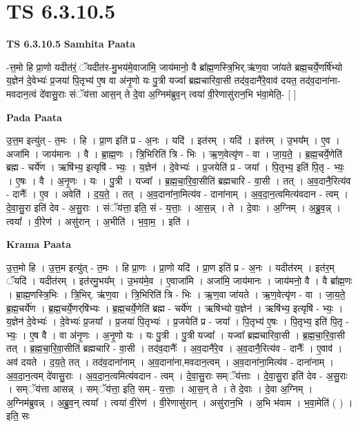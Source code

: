 \documentclass[17pt]{extarticle}
\begin{document}
\section{ TS 6.3.10.5 }

\textbf{TS 6.3.10.5 } \newline
\textbf{Samhita Paata} \newline

-त्त॒मो हि प्रा॒णो यदीत॑रं॒ ॅयदीत॑र-मु॒भय॑मे॒वाजा॑मि॒ जाय॑मानो॒ वै ब्रा᳚ह्म॒णस्त्रि॒भिर्.ऋ॑ण॒वा जा॑यते ब्रह्म॒चर्ये॒णर्षि॑भ्यो य॒ज्ञेन॑ दे॒वेभ्यः॑ प्र॒जया॑ पि॒तृभ्य॑ ए॒ष वा अ॑नृ॒णो यः पु॒त्री यज्वा᳚ ब्रह्मचारिवा॒सी तद॑व॒दानै॑रे॒वाव॑ दयत॒ तद॑व॒दाना॑ना-मवदान॒त्वं दे॑वासु॒राः संॅय॑त्ता आस॒न् ते दे॒वा अ॒ग्निम॑ब्रुव॒न् त्वया॑ वी॒रेणासु॑रान॒भि भ॑वा॒मेति॒- [  ] \newline

\textbf{Pada Paata} \newline

उ॒त्त॒म इत्यु॑त् - त॒मः । हि । प्रा॒ण इति॑ प्र - अ॒नः । यदि॑ । इत॑रम् । यदि॑ । इत॑रम् । उ॒भय᳚म् । ए॒व । अजा॑मि । जाय॑मानः । वै । ब्रा॒ह्म॒णः । त्रि॒भिरिति॑ त्रि - भिः । ऋ॒ण॒वेत्यृ॑ण - वा । जा॒य॒ते॒ । ब्र॒ह्म॒चर्ये॒णेति॑ ब्रह्म - चर्ये॑ण । ऋषि॑भ्य॒ इत्यृषि॑ - भ्यः॒ । य॒ज्ञेन॑ । दे॒वेभ्यः॑ । प्र॒जयेति॑ प्र - जया᳚ । पि॒तृभ्य॒ इति॑ पि॒तृ - भ्यः॒ । ए॒षः । वै । अ॒नृ॒णः । यः । पु॒त्री । यज्वा᳚ । ब्र॒ह्म॒चा॒रि॒वा॒सीति॑ ब्रह्मचारि - वा॒सी । तत् । अ॒व॒दानै॒रित्य॑व - दानैः᳚ । ए॒व । अवेति॑ । द॒य॒ते॒ । तत् । अ॒व॒दाना॑ना॒मित्य॑व - दाना॑नाम् । अ॒व॒दा॒न॒त्वमित्य॑वदान - त्वम् । दे॒वा॒सु॒रा इति॑ देव - अ॒सु॒राः । संॅय॑त्ता॒ इति॒ सं - य॒त्ताः॒ । आ॒स॒न्न् । ते । दे॒वाः । अ॒ग्निम् । अ॒ब्रु॒व॒न्न् । त्वया᳚ । वी॒रेण॑ । असु॑रान् । अ॒भीति॑ । भ॒वा॒म॒ । इति॑ ।  \newline


\textbf{Krama Paata} \newline

उ॒त्त॒मो हि । उ॒त्त॒म इत्यु॑त् - त॒मः । हि प्रा॒णः । प्रा॒णो यदि॑ । प्रा॒ण इति॑ प्र - अ॒नः । यदीत॑रम् । इत॑र॒म् ॅयदि॑ । यदीत॑रम् । इत॑रमु॒भय᳚म् । उ॒भय॑मे॒व । ए॒वाजा॑मि । अजा॑मि॒ जाय॑मानः । जाय॑मनो॒ वै । वै ब्रा᳚ह्म॒णः । ब्रा॒ह्म॒णस्त्रि॒भिः । त्रि॒भिर्. ऋ॑ण॒वा । त्रि॒भिरिति॑ त्रि - भिः । ऋ॒ण॒वा जा॑यते । ऋ॒ण॒वेत्यृ॑ण - वा । जा॒य॒ते॒ ब्र॒ह्म॒चर्ये॑ण । ब्र॒ह्म॒चर्ये॒णर्‌षि॑भ्यः । ब्र॒ह्म॒चर्ये॒णेति॑ ब्रह्म - चर्ये॑ण । ऋषि॑भ्यो य॒ज्ञेन॑ । ऋषि॑भ्य॒ इत्यृषि॑ - भ्यः॒ । य॒ज्ञेन॑ दे॒वेभ्यः॑ । दे॒वेभ्यः॑ प्र॒जया᳚ । प्र॒जया॑ पि॒तृभ्यः॑ । प्र॒जयेति॑ प्र - जया᳚ । पि॒तृभ्य॑ ए॒षः । पि॒तृभ्य॒ इति॑ पि॒तृ - भ्यः॒ । ए॒ष वै । वा अ॑नृ॒णः । अ॒नृ॒णो यः । यः पु॒त्री । पु॒त्री यज्वा᳚ । यज्वा᳚ ब्रह्मचारिवा॒सी । ब्र॒ह्म॒चा॒रि॒वा॒सी तत् । ब्र॒ह्म॒चा॒रि॒वा॒सीति॑ ब्रह्मचारि - वा॒सी । तद॑व॒दानैः᳚ । अ॒व॒दानै॑रे॒व । अ॒व॒दानै॒रित्य॑व - दानैः᳚ । ए॒वाव॑ । अव॑ दयते । द॒य॒ते॒ तत् । तद॑व॒दाना॑नाम् । अ॒व॒दाना॑ना,मवदान॒त्वम् । अ॒व॒दाना॑ना॒मित्य॑व - दाना॑नाम् । अ॒व॒दा॒न॒त्वम् दे॑वासु॒राः । अ॒व॒दा॒न॒त्वमित्य॑वदान - त्वम् । दे॒वा॒सु॒राः सम्ॅय॑त्ताः । दे॒वा॒सु॒रा इति॑ देव - अ॒सु॒राः । सम्ॅय॑त्ता आसन्न् । सम्ॅय॑त्ता॒ इति॒ सम् - य॒त्ताः॒ । आ॒स॒न् ते । ते दे॒वाः । दे॒वा अ॒ग्निम् । अ॒ग्निम॑ब्रुवन्न् । अ॒ब्रु॒व॒न् त्वया᳚ । त्वया॑ वी॒रेण॑ । वी॒रेणासु॑रान् । असु॑रान॒भि । अ॒भि भ॑वाम । 
भ॒वा॒मेति॑ ( ) । इति॒ सः \newline
\end{document}
